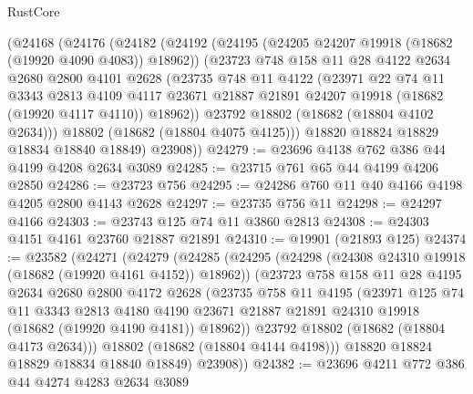 \begin{lexlean}{RustCore}
\begin{coremodule}
    (@24168
      (@24176
        (@24182
          (@24192
            (@24195 (@24205 @24207 @19918 (@18682 (@19920 @4090 @4083)) @18962))
            (@23723
              @748
              @158
              @11
              @28
              @4122
              @2634
              @2680
              @2800
              @4101
              @2628
              (@23735
                @748
                @11
                @4122
                (@23971
                  @22
                  @74
                  @11
                  @3343
                  @2813
                  @4109
                  @4117
                  @23671
                  @21887
                  @21891
                  @24207
                  @19918
                  (@18682 (@19920 @4117 @4110))
                  @18962))
              @23792
              @18802
              (@18682 (@18804 @4102 @2634)))
            @18802
            (@18682 (@18804 @4075 @4125)))
          @18820
          @18824
          @18829
          @18834
          @18840
          @18849)
        @23908))
@24279 := @23696 @4138 @762 @386 @44 @4199 @4208 @2634 @3089
@24285 := @23715 @761 @65 @44 @4199 @4206 @2850
@24286 := @23723 @756
@24295 := @24286 @760 @11 @40 @4166 @4198 @4205 @2800 @4143 @2628
@24297 := @23735 @756 @11
@24298 := @24297 @4166
@24303 := @23743 @125 @74 @11 @3860 @2813
@24308 := @24303 @4151 @4161 @23760 @21887 @21891
@24310 := @19901 (@21893 @125)
@24374 := @23582
    (@24271
      (@24279
        (@24285
          (@24295
            (@24298 (@24308 @24310 @19918 (@18682 (@19920 @4161 @4152)) @18962))
            (@23723
              @758
              @158
              @11
              @28
              @4195
              @2634
              @2680
              @2800
              @4172
              @2628
              (@23735
                @758
                @11
                @4195
                (@23971
                  @125
                  @74
                  @11
                  @3343
                  @2813
                  @4180
                  @4190
                  @23671
                  @21887
                  @21891
                  @24310
                  @19918
                  (@18682 (@19920 @4190 @4181))
                  @18962))
              @23792
              @18802
              (@18682 (@18804 @4173 @2634)))
            @18802
            (@18682 (@18804 @4144 @4198)))
          @18820
          @18824
          @18829
          @18834
          @18840
          @18849)
        @23908))
@24382 := @23696 @4211 @772 @386 @44 @4274 @4283 @2634 @3089

\end{coremodule}
\end{lexlean}
